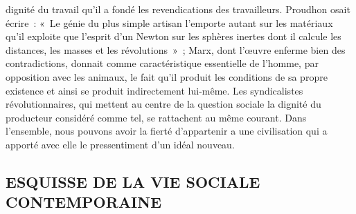 \documentclass[french,twoside]{book} %
\begin{document}
dignité du travail qu'il a fondé les revendications des travailleurs. Proudhon osait écrire : « Le génie du plus simple artisan l'emporte autant sur les matériaux qu'il exploite que l'esprit d'un Newton sur les sphères inertes dont il calcule les distances, les masses et les révolutions » ; Marx, dont l'œuvre enferme bien des contradictions, donnait comme caractéristique essentielle de l'homme, par opposition avec les animaux, le fait qu'il produit les conditions de sa propre existence et ainsi se produit indirectement lui-même. Les syndicalistes révolutionnaires, qui mettent au centre de la question sociale la dignité du producteur considéré comme tel, se rattachent au même courant. Dans l'ensemble, nous pouvons avoir la fierté d'appartenir a une civilisation qui a apporté avec elle le pressentiment d'un idéal nouveau.
\subsection[ESQUISSE DE LA VIE SOCIALE. CONTEMPORAINE]{ESQUISSE DE LA VIE SOCIALE \\
CONTEMPORAINE}
\end{document}
